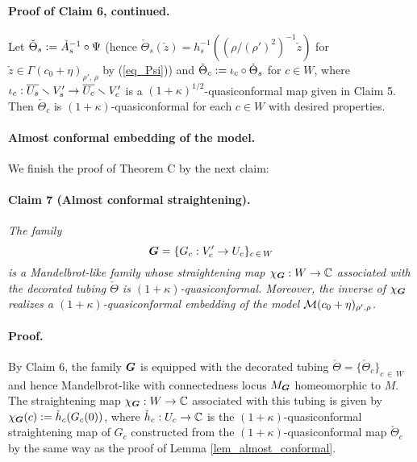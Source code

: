  
\medskip

\paragraph{\bf Proof of Claim 6, continued.} 
Let $\check{\Theta}_s:=\check{A}_s^{-1}\circ \Psi$
(hence 
$\check{\Theta}_s(\check{z})=h_s^{-1} ((\rho/(\rho')^2)^{-1} \check{z})$
for $\check{z} \in \Gamma(c_0+\eta)_{\rho',\,\rho}$ by
(\ref{eq_Psi}))
and $\check{\Theta}_c:=\iota_c \circ \check{\Theta}_s$ for $c \in {W}$,
where $\iota_c: \overline{U_s}  \smallsetminus  {V_s'} \to \overline{U_c}  \smallsetminus  {V_c'}$
is a $(1+\kappa)^{1/2}$-quasiconformal map given in Claim 5.
Then $\check{\Theta}_c$ is $(1+\kappa)$-quasiconformal for each $c \in W$
with desired properties.
\QED 



\medskip

\paragraph{\bf Almost conformal embedding of the model.}
We finish the proof of Theorem C by the next claim:

\paragraph{\bf Claim 7 (Almost conformal straightening).}
{\it 
The family 
$$
\boldsymbol{G}= 
\{G_c: {V}_c' \to {U}_c\}_{c  \,\in \,W} 
$$
is a Mandelbrot-like family whose straightening map
$\chi_{\boldsymbol{G}}: W \to \mathbb C$ associated with the decorated tubing 
$\check{\Theta}$ is $(1+\kappa)$-quasiconformal. 
Moreover, the inverse of $\chi_{\boldsymbol{G}}$ realizes a $(1+\kappa)$-quasiconformal embedding 
of the model ${\mathcal{M}}(c_0+\eta)_{\rho',\rho}$.
}

\medskip

\paragraph{\bf Proof.}
By Claim 6, the family $\boldsymbol{G}$ is equipped with the decorated 
tubing $\check{\Theta}=\{\check{\Theta}_c\}_{c \, \in \, W}$ 
and hence Mandelbrot-like with connectedness locus $M_{\boldsymbol{G}}$
homeomorphic to $M$.
The straightening map $\chi_{\boldsymbol{G}}: W \to \mathbb C$ associated with 
this tubing is given by $\chi_{\boldsymbol{G}}(c):=\check{h}_c(G_c(0))$,
where $\check{h}_c:U_c \to \mathbb C$ is the $(1+\kappa)$-quasiconformal 
straightening map of $G_c$ constructed from 
the $(1+\kappa)$-quasiconformal map $\check{\Theta}_c$ 
by the same way as the proof of Lemma \ref{lem_almost_conformal}.

